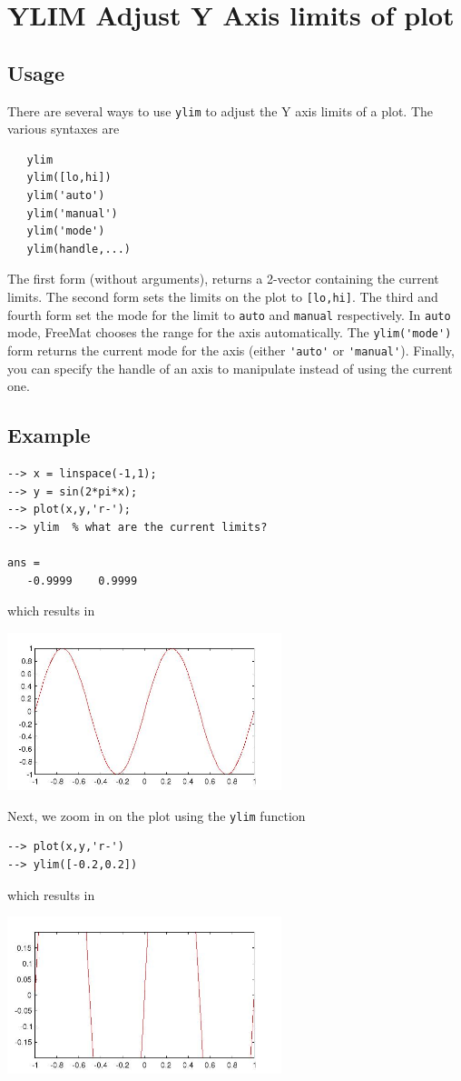 \section{YLIM Adjust Y Axis limits of plot}

\subsection{Usage}

There are several ways to use \verb|ylim| to adjust the Y axis limits of
a plot.  The various syntaxes are
\begin{verbatim}
   ylim
   ylim([lo,hi])   
   ylim('auto')
   ylim('manual')
   ylim('mode')
   ylim(handle,...)
\end{verbatim}
The first form (without arguments), returns a 2-vector containing the
current limits.  The second form sets the limits on the plot to \verb|[lo,hi]|.
The third and fourth form set the mode for the limit to \verb|auto| and \verb|manual|
respectively.  In \verb|auto| mode, FreeMat chooses the range for the axis 
automatically.  The \verb|ylim('mode')| form returns the current mode for the axis
(either \verb|'auto'| or \verb|'manual'|).  Finally, you can specify the handle of an
axis to manipulate instead of using the current one.
\subsection{Example}

\begin{verbatim}
--> x = linspace(-1,1);
--> y = sin(2*pi*x);
--> plot(x,y,'r-');
--> ylim  % what are the current limits?

ans = 
   -0.9999    0.9999 
\end{verbatim}
which results in


\centerline{\includegraphics[width=8cm]{ylim1}}

Next, we zoom in on the plot using the \verb|ylim| function
\begin{verbatim}
--> plot(x,y,'r-')
--> ylim([-0.2,0.2])
\end{verbatim}
which results in


\centerline{\includegraphics[width=8cm]{ylim2}}

